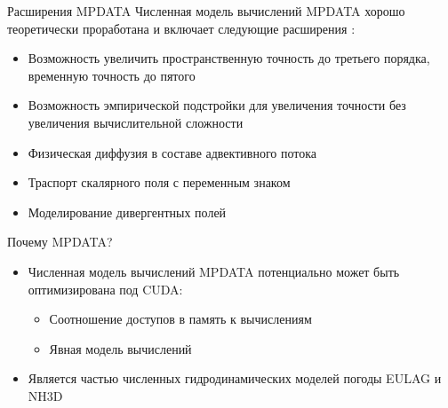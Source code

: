 \begin{frame}{Расширения MPDATA}
Численная модель вычислений MPDATA хорошо теоретически проработана и включает следующие расширения \cite{smolar:mpdata-solver}:
\begin{itemize}
  \item Возможность увеличить пространственную точность до третьего порядка, временную точность до пятого
  \item Возможность эмпирической подстройки для увеличения точности без увеличения вычислительной сложности
  \item Физическая диффузия в составе адвективного потока
  \item Траспорт скалярного поля с переменным знаком
  \item Моделирование дивергентных полей
\end{itemize}
\end{frame}

\begin{frame}{Почему MPDATA?}
\begin{itemize}
\item Численная модель вычислений MPDATA потенциально может быть оптимизирована под CUDA:
\begin{itemize}
  \item Соотношение доступов в память к вычислениям
  \item Явная модель вычислений
\end{itemize}
  \item Является частью численных гидродинамических моделей погоды EULAG и NH3D
\end{itemize}
\end{frame}


